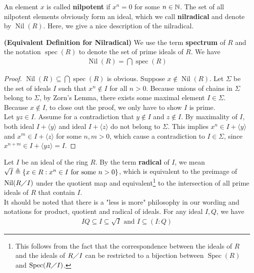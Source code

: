 \documentclass{report}
\begin{document}
An element $x$ is called \textbf{nilpotent} if $x^n=0$ for some  $n\in\mathbb{N}$. The set of all nilpotent elements obviously form an ideal, which we call \textbf{nilradical} and denote by $\operatorname{Nil}(R)$. Here, we give a nice description of the nilradical. 
\begin{theorem}
\textbf{(Equivalent Definition for Nilradical)} We use the term \textbf{spectrum} of $R$ and the notation  $\operatorname{spec}(R)$ to denote the set of prime ideals of $R$. We have 
 \begin{align*}
\operatorname{Nil}(R)=\bigcap \operatorname{spec}(R)
\end{align*}
\end{theorem}
\begin{proof}
$\operatorname{Nil}(R)\subseteq \bigcap \operatorname{spec}(R)$ is obvious. Suppose $x \not\in \operatorname{Nil}(R)$. Let $\Sigma$ be the set of ideals $I$ such that $x^n\not\in I$ for all $n>0$. Because unions of chains in $\Sigma$ belong to $\Sigma$, by Zorn's Lemma, there exists some maximal element $I \in \Sigma$. Because $x\not \in I$, to close out the proof, we only have to show $I$ is prime.\\

Let $yz \in I$. Assume for a contradiction that $y\not\in I$ and $z\not\in I$. By maximality of $I$, both ideal $I+ \langle y\rangle$ and ideal $I+\langle z\rangle$ do not belong to $\Sigma$. This implies $x^n \in I+ \langle y\rangle$ and $x^m \in I + \langle z\rangle $ for some $n,m>0$, which cause a contradiction to $I \in \Sigma$, since $x^{n+m} \in I + \langle yz\rangle =I$. 
\end{proof}
Let $I$ be an ideal of the ring $R$. By the term \textbf{radical} of $I$, we mean $\sqrt{I}\triangleq \{  x \in R : x^n \in I \text{ for some } n > 0  \}$, which is equivalent to  the preimage of $\operatorname{Nil}(R \diagup  I)$ under the quotient map and equivalent\footnote{This follows from the fact that the correspondence between the ideals of $R$ and the ideals of $R \diagup  I$ can be restricted to a bijection between $\operatorname{Spec}(R)$ and $\operatorname{Spec}(R \diagup  I)$.} to the intersection of all prime ideals of $R$ that contain $I$. \\

It should be noted that there is a "less is more" philosophy in our wording and notations for product, quotient and radical of ideals. For any ideal $I,Q$, we have 
 \begin{align*}
IQ \subseteq I \subseteq \sqrt{I}  \text{ and }I \subseteq (I:Q)
\end{align*}
\end{document}
